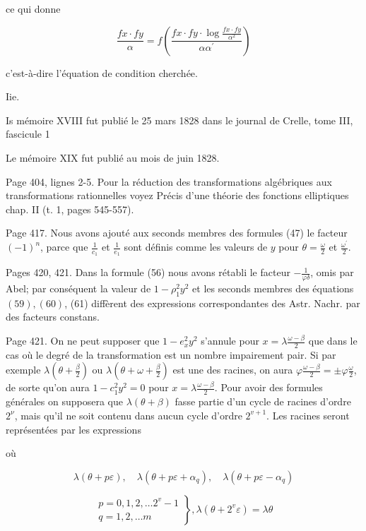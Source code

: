\documentclass{article}
\begin{document}
ce qui donne

\[
\frac{f x \cdot f y}{\alpha}=f\left(\frac{f x \cdot f y \cdot \log \frac{f x \cdot f y}{\alpha^{2}}}{\alpha \alpha^{\prime}}\right)
\]

c'est-à-dire l'équation de condition cherchée.

Iie.

Is mémoire XVIII fut publié le 25 mars 1828 dans le journal de Crelle, tome III, fascicule 1

Le mémoire XIX fut publié au mois de juin 1828.

Page 404, lignes 2-5. Pour la réduction des transformations algébriques aux transformations rationnelles voyez Précis d'une théorie des fonctions elliptiques chap. II (t. 1, pages 545-557).

Page 417. Nous avons ajouté aux seconds membres des formules (47) le facteur \((-1)^{n}\), parce que \(\frac{1}{c_{1}}\) et \(\frac{1}{e_{1}}\) sont définis comme les valeurs de \(y\) pour \(\theta=\frac{\omega}{2}\) et \(\frac{\omega^{\prime}}{2}\).

Pages 420, 421. Dans la formule (56) nous avons rétabli le facteur \(-\frac{1}{\varphi \delta}\), omis par Abel; par conséquent la valeur de \(1-\rho_{1}^{2} y^{2}\) et les seconds membres des équations \((59),(60)\), (61) diffèrent des expressions correspondantes des Astr. Nachr. par des facteurs constans.

Page 421. On ne peut supposer que \(1-e_{x}^{2} y^{2}\) s'annule pour \(x=\lambda \frac{\omega-\beta}{2}\) que dans le cas où le degré de la transformation est un nombre impairement pair. Si par exemple \(\lambda\left(\theta+\frac{\beta}{2}\right)\) ou \(\lambda\left(\theta+\omega+\frac{\beta}{2}\right)\) est une des racines, on aura \(\varphi \frac{\omega-\beta}{2}= \pm \varphi \frac{\omega}{2}\),
de sorte qu'on aura \(1-c_{1}^{2} y^{2}=0\) pour \(x=\lambda \frac{\omega-\beta}{2}\). Pour avoir des formules générales on supposera que \(\lambda(\theta+\beta)\) fasse partie d'un cycle de racines d'ordre \(2^{\nu}\), mais qu'il ne soit contenu dans aucun cycle d'ordre \(2^{v+1}\). Les racines seront représentées par les expressions

où

\[
\lambda(\theta+p \varepsilon), \quad \lambda\left(\theta+p \varepsilon+\alpha_{q}\right), \quad \lambda\left(\theta+p \varepsilon-\alpha_{q}\right)
\]

\[
\left.\begin{array}{l}
p=0,1,2, \ldots 2^{v}-1 \\
q=1,2, \ldots m
\end{array}\right\}, \lambda\left(\theta+2^{v} \varepsilon\right)=\lambda \theta
\]
\end{document}
